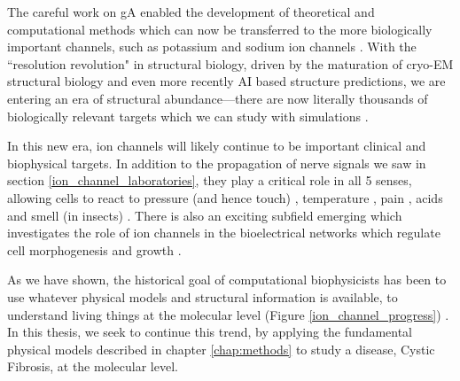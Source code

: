 The careful work on gA enabled the development of theoretical and computational methods which can now be transferred to the more biologically important channels, such as potassium and sodium ion channels \cite{rashid2013, li2021, vandenberg2021,flood2019}. With the ``resolution revolution" in structural biology, driven by the maturation of cryo-EM structural biology and even more recently AI based structure predictions, we are entering an era of structural abundance---there are now literally thousands of biologically relevant targets which we can study with simulations \cite{jumper2021, frank2021, cheng2017a}. 


In this new era, ion channels will likely continue to be important clinical and biophysical targets. In addition to the propagation of nerve signals we saw in section \ref{ion_channel_laboratories}, they play a critical role in all 5 senses, allowing cells to react to pressure (and hence touch) \cite{chesler2018}, temperature \cite{castillo2018}, pain \cite{kingwell2019}, acids \cite{kweon2013} and smell (in insects) \cite{sato2008}. There is also an exciting subfield emerging which investigates the role of ion channels in the bioelectrical networks which regulate cell morphogenesis and growth \cite{lang2005, sundelacruz2009, levin2014, levin2014a}.

As we have shown, the historical goal of computational biophysicists has been to use whatever physical models and structural information is available, to understand living things at the molecular level (Figure \ref{ion_channel_progress}) \cite{lev2020, chen2021}. In this thesis, we seek to continue this trend, by applying the fundamental physical models described in chapter \ref{chap:methods} to study a disease, Cystic Fibrosis, at the molecular level.

